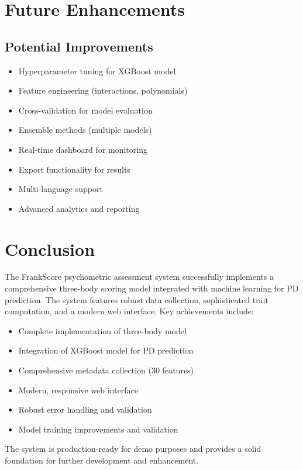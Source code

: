 \documentclass[11pt,a4paper]{article}
\begin{document}
\section{Future Enhancements}

\subsection{Potential Improvements}
\begin{itemize}
    \item Hyperparameter tuning for XGBoost model
    \item Feature engineering (interactions, polynomials)
    \item Cross-validation for model evaluation
    \item Ensemble methods (multiple models)
    \item Real-time dashboard for monitoring
    \item Export functionality for results
    \item Multi-language support
    \item Advanced analytics and reporting
\end{itemize}

\section{Conclusion}

The FrankScore psychometric assessment system successfully implements a comprehensive three-body scoring model integrated with machine learning for PD prediction. The system features robust data collection, sophisticated trait computation, and a modern web interface. Key achievements include:

\begin{itemize}
    \item Complete implementation of three-body model
    \item Integration of XGBoost model for PD prediction
    \item Comprehensive metadata collection (30 features)
    \item Modern, responsive web interface
    \item Robust error handling and validation
    \item Model training improvements and validation
\end{itemize}

The system is production-ready for demo purposes and provides a solid foundation for further development and enhancement.
\end{document}
